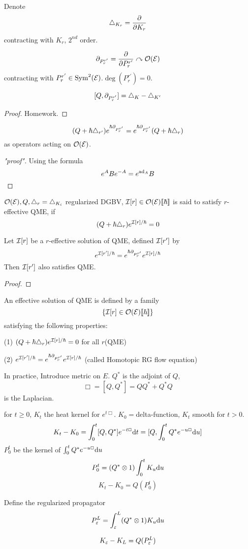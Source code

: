 Denote
$$\triangle_{K_r}=\frac{\partial } {\partial K_r}$$
contracting with $K_r$, $2^{nd}$ order.

$$\partial_{P_r^{r'}}=\frac{\partial } {\partial P_r^{r'}}\curvearrowright\mathcal{O}(\mathcal{E})$$
contracting with $P_r^{r'}\in\operatorname{Sym}^2(\mathcal{E})$.$\deg(P_r^{r'})=0$.

\begin{lemma}
$$[Q,\partial_{P_r^{r'}}]=\triangle_{K}-\triangle_{K'}$$
\end{lemma}
\begin{proof}
Homework.
\end{proof}

\begin{cor}
$$(Q+\hbar\triangle_{r'})e^{\hbar\partial_{P_r^{r'}}}
=e^{\hbar\partial_{P^{r'}_r}}(Q+\hbar\triangle_r)
$$
as operators acting on $\mathcal{O}(\mathcal{E})$.
\end{cor}
\begin{proof}["proof"]
Using the formula
$$e^ABe^{-A}=e^{\operatorname{ad}_A}B$$
\end{proof}


\begin{definition}
$\mathcal{O}(\mathcal{E}),Q,\triangle_r=\triangle_{K_i}$ regularized DGBV,
$\mathcal{I}[r]\in\mathcal{O}(\mathcal{E})[\![\hbar]\!]$ is said to satisfy
$r$-effective QME, if
$$(Q+\hbar\triangle_r)e^{\mathcal{I}[r]/\hbar}=0$$
\end{definition}
\begin{prop}
Let $\mathcal{I}[r]$ be a $r$-effective solution of QME, defined
$\mathcal{I}[r']$ by
$$e^{\mathcal{I}[r']/\hbar}=e^{\hbar\partial_{P_r^{r'}}}e^{\mathcal{I}[r]/\hbar}$$
Then $\mathcal{I}[r']$ also satisfies QME.
\end{prop}

\begin{proof}
\end{proof}

\begin{definition}
An effective solution of QME is defined by a family
$$\{\mathcal{I}[r]\in\mathcal{O}(\mathcal{E})[\![\hbar]\!]\}$$
satisfying the following properties:

(1) $(Q+\hbar\triangle_r)e^{\mathcal{I}[r]/\hbar}=0$ for all $r$(QME)

(2) $e^{\mathcal{I}[r']/\hbar}=e^{\hbar\partial_{P_r^{r'}}}e^{\mathcal{I}[r]/\hbar}$
(called Homotopic RG flow equation)
\end{definition}

In practice, Introduce metric on $E$. $Q^*$ is the adjoint of $Q$,
$$\Box=[Q,Q^*]=QQ^*+Q^*Q$$
is the Laplacian.

for $t\geq 0$, $K_t$ the heat kernel for $e^{t\Box}$.
$K_0=$delta-function, $K_t$ smooth for $t>0$.
$$K_t-K_0=
\int_0^t[Q,Q^*]e^{-t\Box}\mathrm{d} t
=[Q,\int_0^tQ^*e^{-u\Box}\mathrm{d} u]$$
$P_0^t$ be the kernel of $\int_0^tQ^*e^{-u\Box}\mathrm{d} u$
$$P_0^t=(Q^*\otimes 1)\int_0^tK_u\mathrm{d} u$$
$$K_t-K_0=Q(P_0^t)$$

Define the regularized propagator
$$P_\varepsilon^L=\int_\varepsilon^L(Q^*\otimes 1)K_u\mathrm{d} u$$

$$K_\varepsilon-K_L=Q(P_{\varepsilon}^L)$$








